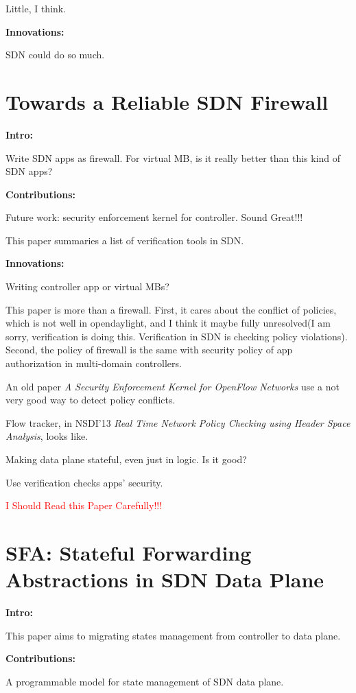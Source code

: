 Little, I think.

\noindent
\textbf{Innovations:}

SDN could do so much.

\section{Towards a Reliable SDN Firewall}
\label{sec:5}
\textbf{Intro:}

Write SDN apps as firewall. For virtual MB, is it really better than this kind of SDN apps?

\noindent
\textbf{Contributions:}

Future work: security enforcement kernel for controller. Sound Great!!! 

This paper summaries a list of verification tools in SDN.

\noindent
\textbf{Innovations:}

Writing controller app or virtual MBs?

This paper is more than a firewall. First, it cares about the conflict of policies, which is not well in opendaylight, and I think it maybe fully unresolved(I am sorry, verification is doing this. Verification in SDN is checking policy violations). Second, the policy of firewall is the same with security policy of app authorization in multi-domain controllers.

An old paper \emph{A Security Enforcement Kernel for OpenFlow Networks} use a not very good way to detect policy conflicts.

Flow tracker, in NSDI'13 \emph{Real Time Network Policy Checking using Header Space Analysis}, looks like.

Making data plane stateful, even just in logic. Is it good?

Use verification checks apps' security.

\textcolor{red}{I Should Read this Paper Carefully!!!}


\section{SFA: Stateful Forwarding Abstractions in SDN Data Plane}
\label{sec:6}

\textbf{Intro:}

This paper aims to migrating states management from controller to data plane.

\noindent
\textbf{Contributions:}

A programmable model for state management of SDN data plane.

